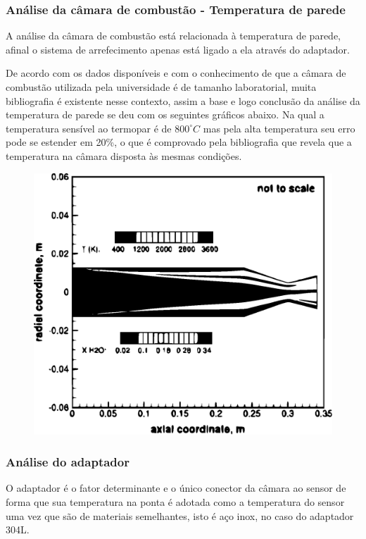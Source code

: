 \subsubsection{Análise da câmara de combustão - Temperatura de parede}

A análise da câmara de combustão está relacionada à temperatura de parede, afinal o sistema de arrefecimento apenas está ligado a ela através do adaptador. 

De acordo com os dados disponíveis e com o conhecimento de que a câmara de combustão utilizada pela universidade é de tamanho laboratorial, muita bibliografia é existente nesse contexto, assim a base e logo conclusão da análise da temperatura de parede se deu com os seguintes gráficos abaixo. Na qual a temperatura sensível ao termopar é de $800^{\circ}C$ mas pela alta temperatura seu erro pode se estender em 20\%, o que é comprovado pela bibliografia que revela que a temperatura na câmara disposta às mesmas condições.

\begin{figure}[!htb]                                                               
   \centering                                                                      
   \includegraphics[scale=0.6, keepaspectratio=true]{figuras/Camara1.eps}                        
\end{figure}

\subsubsection{Análise do adaptador}
O adaptador é o fator determinante e o único conector da câmara ao sensor de forma que sua temperatura na ponta é adotada como a temperatura do sensor uma vez que são de materiais semelhantes, isto é aço inox, no caso do adaptador 304L.


